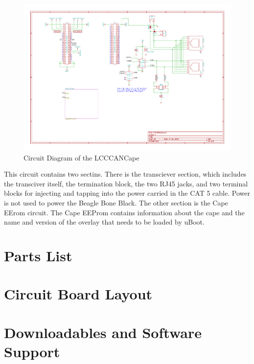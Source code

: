 \begin{figure}[hbpt]\begin{centering}%
\includegraphics[width=5in]{LCCCANCape-1.pdf}                               
\caption{Circuit Diagram of the LCCCANCape}                               
\end{centering}\end{figure}                                                    
This circuit contains two sectins.  There is the transciever section, which 
includes the transciver itself, the termination block, the two RJ45 jacks, and 
two terminal blocks for injecting and tapping into the power carried in the 
CAT 5 cable.  Power is not used to power the Beagle Bone Black.  The other 
section is the Cape EErom circuit.  The Cape EEProm contains         
information about the cape and the name and version of the overlay that needs  
to be loaded by uBoot.  

\section{Parts List}

\section{Circuit Board Layout}

\section{Downloadables and Software Support}

